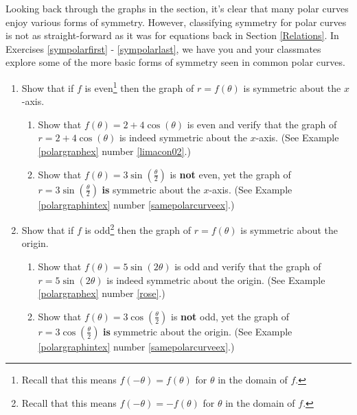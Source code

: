 \documentclass{ximera}
\begin{document}
Looking back through the graphs in the section, it's clear that many polar curves enjoy various forms of symmetry.  However, classifying symmetry for polar curves is not as straight-forward as it was for equations back in Section \ref{Relations}.  In Exercises \ref{sympolarfirst} - \ref{sympolarlast}, we have you and your classmates explore some of the more basic forms of symmetry seen in common polar curves.
\label{polarsymmetry} 


\begin{enumerate}

\setcounter{enumi}{\value{HW}}

\item Show that if $f$ is even\footnote{Recall that this means $f(-\theta) = f(\theta)$ for $\theta$ in the domain of $f$.} then the graph of $r = f(\theta)$ is symmetric about the $x$-axis. \label{sympolarfirst}

\begin{enumerate}

\item Show that $f(\theta) = 2 + 4\cos(\theta)$ is even and verify that the graph of  $r = 2+4\cos(\theta)$ is indeed symmetric about the $x$-axis.  (See Example \ref{polargraphex} number \ref{limacon02}.)

\item Show that $f(\theta) = 3\sin\left(\frac{\theta}{2}\right)$ is \textbf{not} even, yet the graph of $r = 3\sin\left(\frac{\theta}{2}\right)$ \textbf{is} symmetric about the $x$-axis.  (See  Example \ref{polargraphintex} number \ref{samepolarcurveex}.) 

\end{enumerate}

\item  Show that if $f$ is odd\footnote{Recall that this means $f(-\theta) = -f(\theta)$ for $\theta$ in the domain of $f$.} then the graph of $r = f(\theta)$ is symmetric about the origin.

\begin{enumerate}

\item  Show that $f(\theta) = 5\sin(2\theta)$ is odd and verify that the graph of $r = 5\sin(2\theta)$ is indeed symmetric about the origin.  (See Example \ref{polargraphex} number \ref{rose}.)

\item  Show that $f(\theta) = 3\cos\left(\frac{\theta}{2}\right)$ is \textbf{not} odd, yet the graph of $r = 3\cos\left(\frac{\theta}{2}\right)$ \textbf{is} symmetric about the origin.  (See  Example \ref{polargraphintex} number \ref{samepolarcurveex}.)


\end{enumerate}
\end{enumerate}
\end{document}
